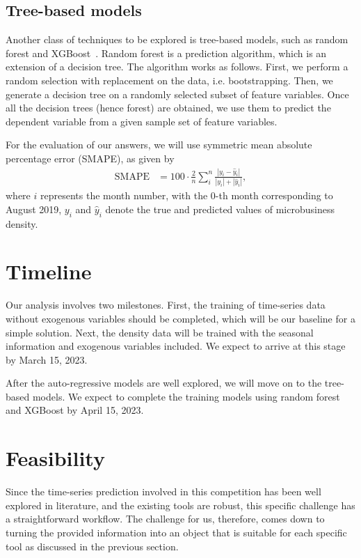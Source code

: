 \documentclass[prl,aps,superscriptaddress,twocolumn,10pt,nolongbibliography]{revtex4-2}
\begin{document}
\subsection{Tree-based models}
Another class of techniques to be explored is tree-based models, such as random forest and XGBoost~\cite{chen2016xgboost}.
Random forest is a prediction algorithm, which is an extension of a decision tree. 
The algorithm works as follows. First, we perform a random selection with replacement on the data, i.e. bootstrapping. 
Then, we generate a decision tree on a randomly selected subset of feature variables. 
Once all the decision trees (hence forest) are obtained, we use them to predict the dependent variable from a given sample set of feature variables.

For the evaluation of our answers, we will use symmetric mean absolute percentage error (SMAPE), as given by
\begin{align}
\textrm{SMAPE} &= 100 \cdot \frac{2}{n} \sum_{i}^n \frac{|y_i - \hat{y}_i|}{|y_i| + |\hat{y}_i|},
\end{align}
where $i$ represents the month number, with the 0-th month corresponding to August 2019, $y_i$ and $\hat{y}_i$ denote the true and predicted values of microbusiness density.

\section{Timeline}
Our analysis involves two milestones. 
First, the training of time-series data without exogenous variables should be completed, which will be our baseline for a simple solution. 
Next, the density data will be trained with the seasonal information and exogenous variables included. 
We expect to arrive at this stage by March 15, 2023.

After the auto-regressive models are well explored, we will move on to the tree-based models. 
We expect to complete the training models using random forest and XGBoost by April 15, 2023. 

\section{Feasibility}
Since the time-series prediction involved in this competition has been well explored in literature, and the existing tools are robust, this specific challenge has a straightforward workflow. 
The challenge for us, therefore, comes down to turning the provided information into an object that is suitable for each specific tool as discussed in the previous section.
\end{document}
